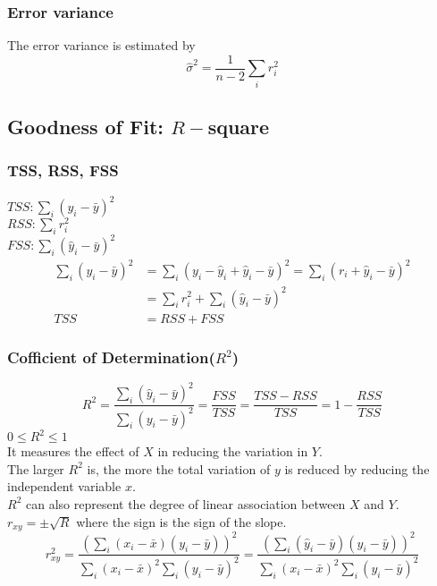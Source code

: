 \documentclass[11pt,a4paper]{article}
\begin{document}
\subsubsection{Error variance}
The error variance is estimated by$$\hat{\sigma}^2=\frac{1}{n-2}\sum_i r_i^2$$

\subsection{Goodness of Fit: $R-$square}
\subsubsection{TSS, RSS, FSS}
$TSS: \sum_i(y_i-\bar{y})^2$\\
$RSS: \sum_ir_i^2$\\
$FSS: \sum_i(\hat{y}_i-\bar{y})^2$
$$\begin{aligned}
    \sum_{i}\left(y_{i}-\bar{y}\right)^{2} &=\sum_{i}\left(y_{i}-\hat{y}_{i}+\hat{y}_{i}-\bar{y}\right)^{2}=\sum_{i}\left(r_{i}+\hat{y}_{i}-\bar{y}\right)^{2} \\
    &=\sum_{i} r_{i}^{2}+\sum_{i}\left(\hat{y}_{i}-\bar{y}\right)^{2} \\
    T S S &=R S S+F S S
    \end{aligned}$$
\subsubsection{Cofficient of Determination($R^2$)}
$$R^{2}=\frac{\sum_{i}\left(\hat{y}_{i}-\bar{y}\right)^{2}}{\sum_{i}\left(y_{i}-\bar{y}\right)^{2}}=\frac{F S S}{T S S}=\frac{T S S-R S S}{T S S}=1-\frac{R S S}{T S S}$$
$0\leq R^2\leq 1$\\
It measures the effect of $X$ in reducing the variation in $Y$.\\
The larger $R^2$ is, the more the total variation of $y$ is reduced by reducing the independent variable $x$.\\

$R^2$ can also represent the degree of linear association between $X$ and $Y$.\\
$r_{xy}=\pm \sqrt{R}$ where the sign is the sign of the slope.
$$r_{xy}^2=\frac{(\sum_{i}\left(x_{i}-\bar{x}\right)\left(y_{i}-\bar{y}\right))^2}{\sum_{i}\left(x_{i}-\bar{x}\right)^{2}\sum_{i}\left(y_{i}-\bar{y}\right)^{2}}=\frac{(\sum_{i}\left(\hat{y}_{i}-\bar{y}\right)\left(y_{i}-\bar{y}\right))^2}{\sum_{i}\left(x_{i}-\bar{x}\right)^{2}\sum_{i}\left(y_{i}-\bar{y}\right)^{2}}$$
\end{document}
